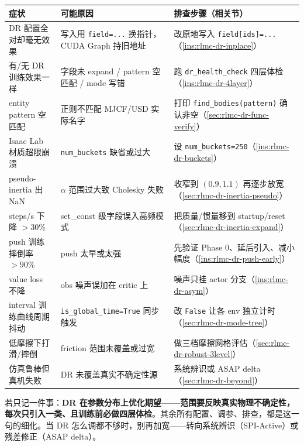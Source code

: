 \begin{center}
\small
\begin{tabular}{@{}p{3.4cm}p{3.8cm}p{4.6cm}@{}}
\toprule
症状 & 可能原因 & 排查步骤（相关节） \\
\midrule
DR 配置全对却毫无效果 & 写入用 \verb|field=...| 换指针，CUDA Graph 持旧地址 & 改原地写入 \verb|field[ids]=...|（\cref{ins:rlmc-dr-inplace}） \\
有/无 DR 训练效果一样 & 字段未 expand / pattern 空匹配 / mode 写错 & 跑 \verb|dr_health_check| 四层体检（\cref{ins:rlmc-dr-4layer}） \\
entity pattern 空匹配 & 正则不匹配 MJCF/USD 实际名字 & 打印 \verb|find_bodies(pattern)| 确认非空（\cref{sec:rlmc-dr-func-verify}） \\
Isaac Lab 材质超限崩溃 & \verb|num_buckets| 缺省或过大 & 设 \verb|num_buckets=250|（\cref{ins:rlmc-dr-buckets}） \\
pseudo-inertia 出 NaN & $\alpha$ 范围过大致 Cholesky 失败 & 收窄到 $(0.9,1.1)$ 再逐步放宽（\cref{sec:rlmc-dr-inertia-pseudo}） \\
steps/s 下降 $>30\%$ & set\_const 级字段误入高频模式 & 把质量/惯量移到 startup/reset（\cref{sec:rlmc-dr-inertia-expand}） \\
push 训练摔倒率 $>90\%$ & push 太早或太强 & 先验证 Phase 0、延后引入、减小幅度（\cref{ins:rlmc-dr-push-early}） \\
value loss 不降 & obs 噪声误加在 critic 上 & 噪声只挂 actor 分支（\cref{ins:rlmc-dr-asym}） \\
interval 训练曲线周期抖动 & \verb|is_global_time=True| 同步触发 & 改 \verb|False| 让各 env 独立计时（\cref{sec:rlmc-dr-mode-tree}） \\
低摩擦下打滑/摔倒 & friction 范围未覆盖或过宽 & 做三档摩擦网格评估（\cref{sec:rlmc-dr-robust-3level}） \\
仿真鲁棒但真机失败 & DR 未覆盖真实不确定性源 & 系统辨识或 ASAP delta（\cref{sec:rlmc-dr-beyond}） \\
\bottomrule
\end{tabular}
\end{center}

\begin{insight}\label{ins:rlmc-dr-oneliner}
若只记一件事：\textbf{DR 在参数分布上优化期望——范围要反映真实物理不确定性，每次只引入一类、且训练前必做四层体检}。其余所有配置、调参、排查，都是这一句的细化。当 DR 怎么调都不够时，别再加宽——转向系统辨识（SPI-Active）或残差修正（ASAP delta）。
\end{insight}

